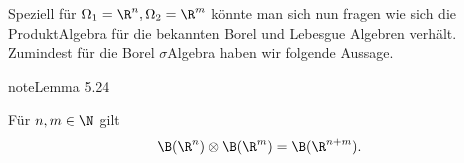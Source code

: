 \documentclass[letterpaper,10pt,german]{jupyterBook}
\begin{document}
\sphinxAtStartPar
Speziell für \(\Omega_1=\R^n, \Omega_2=\R^m\) könnte man sich nun fragen wie sich die Produkt\sphinxhyphen{}Algebra für die bekannten Borel und Lebesgue Algebren verhält. Zumindest für die Borel \(\sigma\)\sphinxhyphen{}Algebra haben wir folgende Aussage.
\label{masstheorie/integrationstechnik:lemma-1}
\begin{sphinxadmonition}{note}{Lemma 5.24}



\sphinxAtStartPar
Für \(n,m\in\N\) gilt
\begin{equation*}
\begin{split}\B(\R^n)\otimes \B(\R^m) = \B(\R^{n+m}).\end{split}
\end{equation*}\end{sphinxadmonition}
\end{document}

